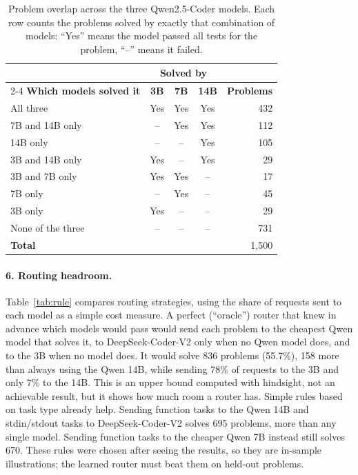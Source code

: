 \begin{table}[!htbp]
\centering
\small
\begin{tabular}{|l|c|c|c|r|}
\hline
 & \multicolumn{3}{c|}{\textbf{Solved by}} & \\
\cline{2-4}
\textbf{Which models solved it} & \textbf{3B} & \textbf{7B} & \textbf{14B} & \textbf{Problems}\\
\hline
All three & Yes & Yes & Yes & 432\\
7B and 14B only & -- & Yes & Yes & 112\\
14B only & -- & -- & Yes & 105\\
3B and 14B only & Yes & -- & Yes & 29\\
3B and 7B only & Yes & Yes & -- & 17\\
7B only & -- & Yes & -- & 45\\
3B only & Yes & -- & -- & 29\\
None of the three & -- & -- & -- & 731\\
\hline
\multicolumn{4}{|l|}{\textbf{Total}} & 1,500\\
\hline
\end{tabular}
\caption{Problem overlap across the three Qwen2.5-Coder models. Each row counts the problems solved by exactly that combination of models: ``Yes'' means the model passed all tests for the problem, ``--'' means it failed.}
\label{tab:overlap}
\end{table}

\paragraph{6. Routing headroom.} Table~\ref{tab:rule} compares routing strategies, using the share of requests sent to each model as a simple cost measure. A perfect (``oracle'') router that knew in advance which models would pass would send each problem to the cheapest Qwen model that solves it, to DeepSeek-Coder-V2 only when no Qwen model does, and to the 3B when no model does. It would solve 836 problems (55.7\%), 158 more than always using the Qwen 14B, while sending 78\% of requests to the 3B and only 7\% to the 14B. This is an upper bound computed with hindsight, not an achievable result, but it shows how much room a router has. Simple rules based on task type already help. Sending function tasks to the Qwen 14B and stdin/stdout tasks to DeepSeek-Coder-V2 solves 695 problems, more than any single model. Sending function tasks to the cheaper Qwen 7B instead still solves 670. These rules were chosen after seeing the results, so they are in-sample illustrations; the learned router must beat them on held-out problems.

